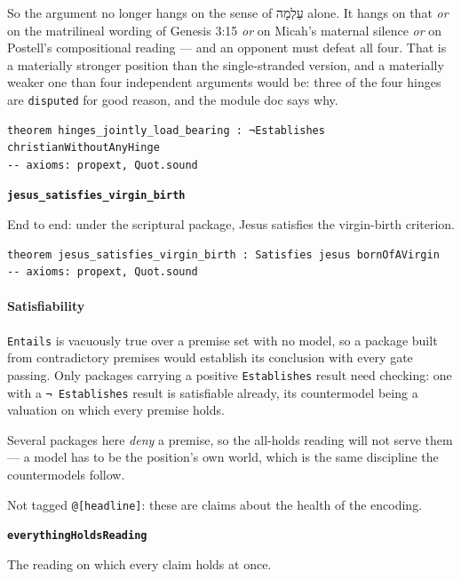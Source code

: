 \documentclass[11pt]{article}
\begin{document}
So the argument no longer hangs on the sense of עַלְמָה alone. It hangs on that \emph{or} on the matrilineal wording of Genesis 3:15 \emph{or} on Micah’s maternal silence \emph{or} on Postell’s compositional reading — and an opponent must defeat all four. That is a materially stronger position than the single-stranded version, and a materially weaker one than four independent arguments would be: three of the four hinges are \texttt{disputed} for good reason, and the module doc says why.

{\small\begin{verbatim}
theorem hinges_jointly_load_bearing : ¬Establishes christianWithoutAnyHinge
-- axioms: propext, Quot.sound
\end{verbatim}}
\par\medskip\noindent\textbf{\texttt{jesus\_\allowbreak{}satisfies\_\allowbreak{}virgin\_\allowbreak{}birth}}\par\nobreak\noindent
End to end: under the scriptural package, Jesus satisfies the virgin-birth criterion.

{\small\begin{verbatim}
theorem jesus_satisfies_virgin_birth : Satisfies jesus bornOfAVirgin
-- axioms: propext, Quot.sound
\end{verbatim}}
\paragraph*{Satisfiability}
\leavevmode\par\nobreak
\texttt{Entails} is vacuously true over a premise set with no model, so a package built from contradictory premises would establish its conclusion with every gate passing. Only packages carrying a positive \texttt{Establishes} result need checking: one with a \texttt{¬ Establishes} result is satisfiable already, its countermodel being a valuation on which every premise holds.

Several packages here \emph{deny} a premise, so the all-holds reading will not serve them — a model has to be the position’s own world, which is the same discipline the countermodels follow.

Not tagged \texttt{@[headline]}: these are claims about the health of the encoding.

\par\medskip\noindent\textbf{\texttt{everything\allowbreak{}Holds\allowbreak{}Reading}}\par\nobreak\noindent
The reading on which every claim holds at once.
\end{document}
